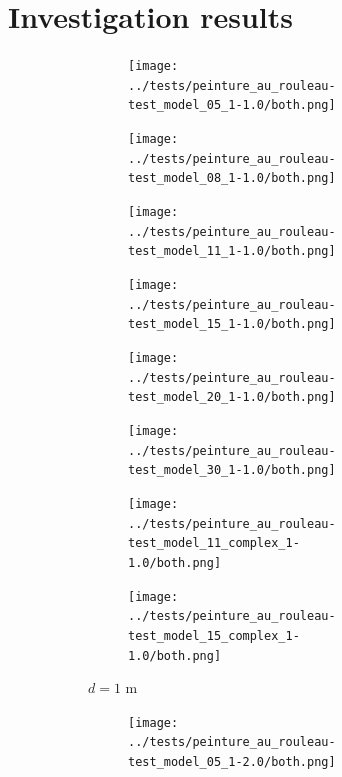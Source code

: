 \documentclass[english,RandD]{rapportPFE}  %
\begin{document}
	\section{Investigation results}
		\label{annexe:resultat}
		\begin{figure}[H]
			\centering
			\begin{subfigure}[t]{\linewidth}
				\centering
				\begin{subfigure}[t]{0.12\linewidth}
					\texttt{[image: ../tests/peinture\_au\_rouleau-test\_model\_05\_1-1.0/both.png]}
				\end{subfigure}
				\hfill
				\begin{subfigure}[t]{0.11\linewidth}
					\texttt{[image: ../tests/peinture\_au\_rouleau-test\_model\_08\_1-1.0/both.png]}
				\end{subfigure}
				\hfill
				\begin{subfigure}[t]{0.11\linewidth}
					\texttt{[image: ../tests/peinture\_au\_rouleau-test\_model\_11\_1-1.0/both.png]}
				\end{subfigure}
				\hfill
				\begin{subfigure}[t]{0.11\linewidth}
					\texttt{[image: ../tests/peinture\_au\_rouleau-test\_model\_15\_1-1.0/both.png]}
				\end{subfigure}
				\hfill
				\begin{subfigure}[t]{0.11\linewidth}
					\texttt{[image: ../tests/peinture\_au\_rouleau-test\_model\_20\_1-1.0/both.png]}
				\end{subfigure}
				\hfill
				\begin{subfigure}[t]{0.11\linewidth}
					\texttt{[image: ../tests/peinture\_au\_rouleau-test\_model\_30\_1-1.0/both.png]}
				\end{subfigure}
				\hfill
				\begin{subfigure}[t]{0.11\linewidth}
					\texttt{[image: ../tests/peinture\_au\_rouleau-test\_model\_11\_complex\_1-1.0/both.png]}
				\end{subfigure}
				\hfill
				\begin{subfigure}[t]{0.11\linewidth}
					\texttt{[image: ../tests/peinture\_au\_rouleau-test\_model\_15\_complex\_1-1.0/both.png]}
				\end{subfigure}
				\caption{$d = 1$ m}
			\end{subfigure}
			\hfill
			\begin{subfigure}[t]{\linewidth}
				\centering
				\begin{subfigure}[t]{0.11\linewidth}
					\texttt{[image: ../tests/peinture\_au\_rouleau-test\_model\_05\_1-2.0/both.png]}

\end{subfigure}
\end{subfigure}
\end{figure}
\end{document}

